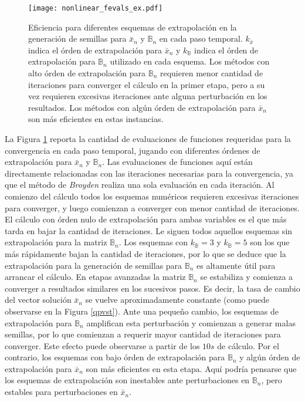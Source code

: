 \begin{figure}[ht]
\centering
\texttt{[image: nonlinear\_fevals\_ex.pdf]}
\caption[Eficiencia para diferentes esquemas de extrapolación en la generación de semillas]
{Eficiencia para diferentes esquemas de extrapolación en la generación de semillas para $\bar{x}_n$ y $\mathbb{B}_n$ en cada paso temporal.
$k_{\bar{x}}$ indica el órden de extrapolación para $\bar{x}_n$ y $k_{\mathbb{B}}$ indica el órden de extrapolación para $\mathbb{B}_n$ utilizado en cada esquema.
Los métodos con alto órden de extrapolación para $\mathbb{B}_n$ requieren menor cantidad de iteraciones para converger el cálculo en la primer etapa,
pero a su vez requieren excesivas iteraciones ante alguna perturbación en los resultados.
Los métodos con algún órden de extrapolación para $\bar{x}_n$ son más eficientes en estas instancias.}
\label{nonlinear_fevals_ex}
\end{figure}
La Figura \ref{nonlinear_fevals_ex} reporta la cantidad de evaluaciones de funciones requeridas para la convergencia en cada paso temporal,
jugando con diferentes órdenes de extrapolación para $\bar{x}_n$ y $\mathbb{B}_n$.
Las evaluaciones de funciones aquí están directamente relacionadas con las iteraciones necesarias para la convergencia,
ya que el método de \textit{Broyden} realiza una sola evaluación en cada iteración.
Al comienzo del cálculo todos los esquemas numéricos requieren excesivas iteraciones para converger,
y luego comienzan a converger con menor cantidad de iteraciones.
El cálculo con órden nulo de extrapolación para ambas variables es el que más tarda en bajar la cantidad de iteraciones.
Le siguen todos aquellos esquemas sin extrapolación para la matriz $\mathbb{B}_n$.
Los esquemas con $k_{\mathbb{B}}=3$ y $k_{\mathbb{B}}=5$ son los que más rápidamente bajan la cantidad de iteraciones,
por lo que se deduce que la extrapolación para la generación de semillas para $\mathbb{B}_n$ es altamente útil para arrancar el cálculo.
En etapas avanzadas la matriz $\mathbb{B}_n$ se estabiliza y comienza a converger a resultados similares en los sucesivos pasos.
Es decir, la tasa de cambio del vector solución $\bar{x}_n$ se vuelve aproximadamente constante (como puede observarse en la Figura \ref{qpvst}).
Ante una pequeño cambio, los esquemas de extrapolación para $\mathbb{B}_n$ amplifican esta perturbación y comienzan a generar malas semillas,
por lo que comienzan a requerir mayor cantidad de iteraciones para converger.
Este efecto puede observarse a partir de los $10s$ de cálculo.
Por el contrario, los esquemas con bajo órden de extrapolación para $\mathbb{B}_n$ y algún órden de extrapolación para $\bar{x}_n$ son más eficientes en esta etapa.
Aquí podría pensarse que los esquemas de extrapolación son inestables ante perturbaciones en $\mathbb{B}_n$, pero estables para perturbaciones en $\bar{x}_n$.

